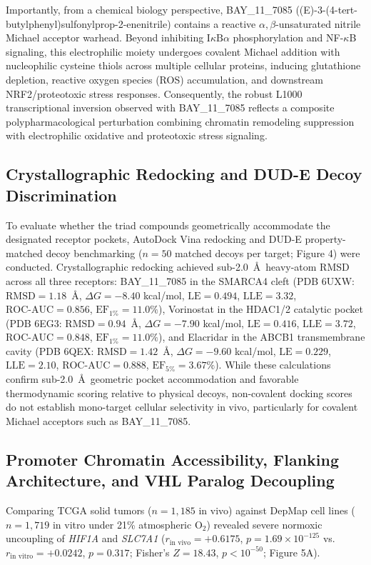 \documentclass[11pt,a4paper]{article}
\begin{document}
Importantly, from a chemical biology perspective, BAY\_11\_7085 ((E)-3-(4-tert-butylphenyl)sulfonylprop-2-enenitrile) contains a reactive $\alpha,\beta$-unsaturated nitrile Michael acceptor warhead. Beyond inhibiting $\text{I}\kappa\text{B}\alpha$ phosphorylation and NF-$\kappa$B signaling, this electrophilic moiety undergoes covalent Michael addition with nucleophilic cysteine thiols across multiple cellular proteins, inducing glutathione depletion, reactive oxygen species (ROS) accumulation, and downstream NRF2/proteotoxic stress responses. Consequently, the robust L1000 transcriptional inversion observed with BAY\_11\_7085 reflects a composite polypharmacological perturbation combining chromatin remodeling suppression with electrophilic oxidative and proteotoxic stress signaling.

\subsection{Crystallographic Redocking and DUD-E Decoy Discrimination}
To evaluate whether the triad compounds geometrically accommodate the designated receptor pockets, AutoDock Vina redocking and DUD-E property-matched decoy benchmarking ($n = 50$ matched decoys per target; Figure 4) were conducted. Crystallographic redocking achieved sub-2.0~\AA\ heavy-atom RMSD across all three receptors: BAY\_11\_7085 in the SMARCA4 cleft (PDB 6UXW: $\text{RMSD} = 1.18$~\AA, $\Delta G = -8.40$ kcal/mol, $\text{LE} = 0.494$, $\text{LLE} = 3.32$, $\text{ROC-AUC} = 0.856$, $\text{EF}_{1\%} = 11.0\%$), Vorinostat in the HDAC1/2 catalytic pocket (PDB 6EG3: $\text{RMSD} = 0.94$~\AA, $\Delta G = -7.90$ kcal/mol, $\text{LE} = 0.416$, $\text{LLE} = 3.72$, $\text{ROC-AUC} = 0.848$, $\text{EF}_{1\%} = 11.0\%$), and Elacridar in the ABCB1 transmembrane cavity (PDB 6QEX: $\text{RMSD} = 1.42$~\AA, $\Delta G = -9.60$ kcal/mol, $\text{LE} = 0.229$, $\text{LLE} = 2.10$, $\text{ROC-AUC} = 0.888$, $\text{EF}_{5\%} = 3.67\%$). While these calculations confirm sub-2.0~\AA\ geometric pocket accommodation and favorable thermodynamic scoring relative to physical decoys, non-covalent docking scores do not establish mono-target cellular selectivity in vivo, particularly for covalent Michael acceptors such as BAY\_11\_7085.

\subsection{Promoter Chromatin Accessibility, Flanking Architecture, and VHL Paralog Decoupling}
Comparing TCGA solid tumors ($n = 1,185$ in vivo) against DepMap cell lines ($n = 1,719$ in vitro under 21\% atmospheric $\text{O}_2$) revealed severe normoxic uncoupling of \textit{HIF1A} and \textit{SLC7A1} ($r_{\text{in vivo}} = +0.6175$, $p = 1.69 \times 10^{-125}$ vs.\ $r_{\text{in vitro}} = +0.0242$, $p = 0.317$; Fisher's $Z = 18.43$, $p < 10^{-50}$; Figure 5A).
\end{document}
